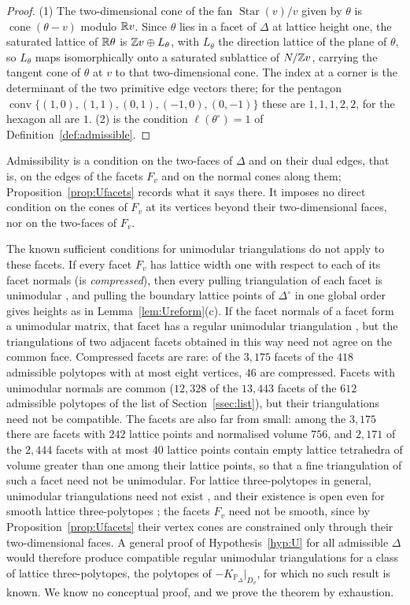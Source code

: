 \begin{proof}
(1) The two-dimensional cone of the fan $\operatorname{Star}(v)/v$ given by $\theta$ is $\operatorname{cone}(\theta-v)$ modulo
$\mathbb R v$. Since $\theta$ lies in a facet of $\Delta$ at lattice height one, the saturated lattice of $\mathbb R\theta$ is
$\mathbb Z v\oplus L_\theta$, with $L_\theta$ the direction lattice of the plane of $\theta$, so $L_\theta$ maps isomorphically onto a
saturated sublattice of $N/\mathbb Z v$, carrying the tangent cone of $\theta$ at $v$ to that two-dimensional cone. The index at a
corner is the determinant of the two primitive edge vectors there; for the pentagon
$\operatorname{conv}\{(1,0),(1,1),(0,1),(-1,0),(0,-1)\}$ these are $1,1,1,2,2$, for the hexagon all are $1$. (2) is the
condition $\ell(\theta^\circ)=1$ of Definition~\ref{def:admissible}.
\end{proof}

Admissibility is a condition on the two-faces of $\Delta$ and on their dual edges, that is, on the edges of the facets
$F_v$ and on the normal cones along them; Proposition~\ref{prop:Ufacets} records what it says there. It imposes no direct
condition on the cones of $F_v$ at its vertices beyond their two-dimensional faces, nor on the two-faces of $F_v$.

The known sufficient conditions for unimodular triangulations do not apply to these facets. If every facet $F_v$ has
lattice width one with respect to each of its facet normals (is \emph{compressed}), then every pulling triangulation
of each facet is unimodular \cite[Thm.~2.3]{HPPS}, and pulling the boundary lattice points of $\Delta^\circ$ in one global
order gives heights as in Lemma~\ref{lem:Ureform}(c). If the facet normals of a facet form a unimodular matrix, that facet
has a regular unimodular triangulation \cite[Thm.~2.4]{HPPS}, but the triangulations of two adjacent facets obtained in this
way need not agree on the common face. Compressed facets are rare: of the $3{,}175$ facets of the $418$ admissible
polytopes with at most eight vertices, $46$ are compressed. Facets with unimodular normals are common ($12{,}328$ of the
$13{,}443$ facets of the $612$ admissible polytopes of the list of Section~\ref{ssec:list}), but their triangulations need not be
compatible. The facets are also far from small: among the $3{,}175$ there are facets with $242$ lattice points and
normalised volume $756$, and $2{,}171$ of the $2{,}444$ facets with at most $40$ lattice points contain empty lattice
tetrahedra of volume greater than one among their lattice points, so that a fine triangulation of such a facet need not be
unimodular. For lattice
three-polytopes in general, unimodular triangulations need not exist \cite[Ex.~1.2]{HPPS}, and their existence is open
even for smooth lattice three-polytopes \cite[\S1.5.1]{HPPS}; the facets $F_v$ need not be smooth, since by
Proposition~\ref{prop:Ufacets} their vertex cones are constrained only through their two-dimensional faces. A general
proof of Hypothesis~\ref{hyp:U} for all admissible $\Delta$ would therefore produce compatible regular unimodular triangulations for a class of lattice
three-polytopes, the polytopes of $-K_{\mathbb P_\Delta}|_{D_v}$, for which no such result is known. We know no conceptual
proof, and we prove the theorem by exhaustion.

